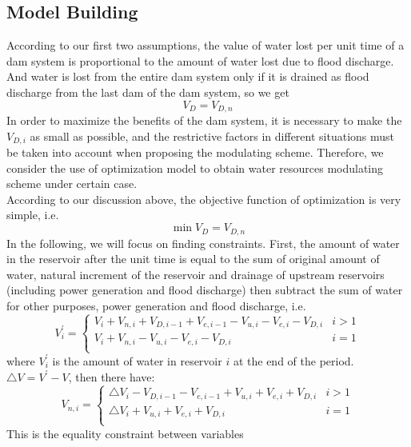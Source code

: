 \documentclass{mcmthesis}
\begin{document}
\subsection{Model Building}
\indent According to our first two assumptions, the value of water lost per unit time of a dam system is proportional to the amount of water lost due to flood discharge. And water is lost from the entire dam system only if it is drained as flood discharge from the last dam of the dam system, so we get
\begin{equation}
V_{D} = V_{D,n}
\end{equation}
\indent In order to maximize the benefits of the dam system, it is necessary to make the $ V_ {D, i} $ as small as possible, and the restrictive factors in different situations must be taken into account when proposing the modulating scheme. Therefore, we consider the use of optimization model to obtain water resources modulating scheme under certain case. \\
\indent According to our discussion above, the objective function of optimization is very simple, i.e.
\begin{equation}
\min V_{D} = V_{D, n}
\end{equation}
\indent In the following, we will focus on finding constraints. First, the amount of water in the reservoir after the unit time is equal to the sum of original amount of water, natural increment of the reservoir and drainage of upstream reservoirs (including power generation and flood discharge) then subtract the sum of water for other purposes, power generation and flood discharge, i.e.
\begin{equation} V_{i}^{'} =
\left\{
\begin{array}{cc}
 V_{i} + V_{n, i} + V_{D, i - 1} + V_{e, i - 1} - V_{u, i} - V_{e, i} - V_{D, i} & i > 1 \\
V_{i} + V_{n, i} - V_{u, i} - V_{e, i} - V_{D, i} & i = 1 \\
\end{array}
\right.
\end{equation}
where $ V_ {i} ^ {'} $ is the amount of water in reservoir $ i $ at the end of the period. 
$\triangle V = V ^ {'} - V $, then there have:
\begin{equation}
V_{n, i} =
\left\{
\begin{array}{cc}
\triangle V_{i} - V_{D, i - 1} - V_{e, i - 1} + V_{u, i} + V_{e, i} + V_{D, i} & i > 1 \\
\triangle V_{i} + V_{u, i} + V_{e, i} + V_{D, i}& i = 1 \\
\end{array}
\right.
\end{equation}
This is the equality constraint between variables
\end{document}
